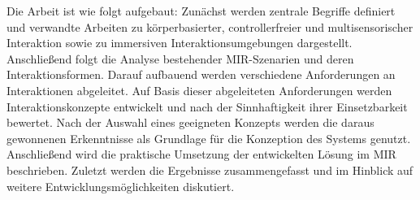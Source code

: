 \documentclass[12pt]{article}\usepackage{graphicx} %
\begin{document}
Die Arbeit ist wie folgt aufgebaut: Zunächst werden zentrale Begriffe definiert und verwandte Arbeiten zu körper\-basierter, controllerfreier und multisensorischer Interaktion sowie zu immersiven Interaktionsumgebungen dargestellt. Anschließend folgt die Analyse bestehender MIR-Szenarien und deren Interaktionsformen. Darauf aufbauend werden verschiedene Anforderungen an Interaktionen abgeleitet. Auf Basis dieser abgeleiteten Anforderungen werden Interaktionskonzepte entwickelt und nach der Sinnhaftigkeit ihrer Einsetzbarkeit bewertet. Nach der Auswahl eines geeigneten Konzepts werden die daraus gewonnenen Erkenntnisse als Grundlage für die Konzeption des Systems genutzt. Anschließend wird die praktische Umsetzung der entwickelten Lösung im MIR beschrieben. Zuletzt werden die Ergebnisse zusammengefasst und im Hinblick auf weitere Entwicklungsmöglichkeiten diskutiert.




\clearpage






\end{document}
